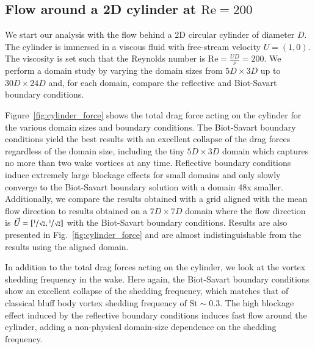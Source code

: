 \documentclass[final,1p,times]{elsarticle}
\begin{document}
\subsection{Flow around a 2D cylinder at $\text{Re}=200$}

We start our analysis with the flow behind a 2D circular cylinder of diameter $D$. The cylinder is immersed in a viscous fluid with free-stream velocity $U=(1,0)$. The viscosity is set such that the Reynolds number is $\text{Re}=\frac{UD}{\nu}=200$. We perform a domain study by varying the domain sizes from $5D\times3D$ up to $30D\times24D$ and, for each domain, compare the reflective and Biot-Savart boundary conditions.

Figure~\ref{fig:cylinder_force} shows the total drag force acting on the cylinder for the various domain sizes and boundary conditions. The Biot-Savart boundary conditions yield the best results with an excellent collapse of the drag forces regardless of the domain size, including the tiny $5D\times3D$ domain which captures no more than two wake vortices at any time. Reflective boundary conditions induce extremely large blockage effects for small domains and only slowly converge to the Biot-Savart boundary solution with a domain 48x smaller. Additionally, we compare the results obtained with a grid aligned with the mean flow direction to results obtained on a $7D\times 7D$ domain where the flow direction is $\vec{U}=[\sfrac 1{\sqrt{2}},\sfrac 1{\sqrt{2}}]$ with the Biot-Savart boundary conditions. Results are also presented in Fig.~\ref{fig:cylinder_force} and are almost indistinguishable from the results using the aligned domain.


In addition to the total drag forces acting on the cylinder, we look at the vortex shedding frequency in the wake. Here again, the Biot-Savart boundary conditions show an excellent collapse of the shedding frequency, which matches that of classical bluff body vortex shedding frequency of $\text{St}\sim 0.3$. The high blockage effect induced by the reflective boundary conditions induces fast flow around the cylinder, adding a non-physical domain-size dependence on the shedding frequency.
\end{document}
